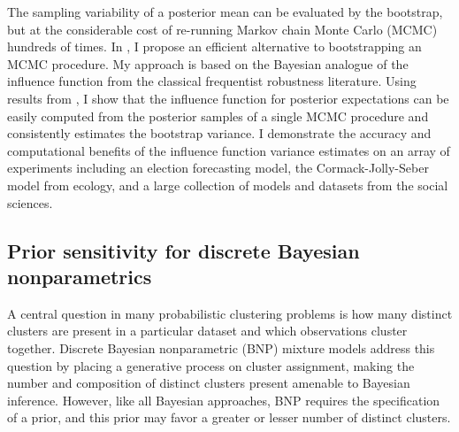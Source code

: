 The sampling variability of a posterior mean can be evaluated by the bootstrap,
but at the considerable cost of re-running Markov chain Monte Carlo (MCMC)
hundreds of times. In \citet{giordano:2020:stanconbayesij,
giordano:2021:bayesij}, I propose an efficient alternative to bootstrapping an
MCMC procedure.  My approach is based on the Bayesian analogue of the influence
function from the classical frequentist robustness literature.  Using results
from \citet{giordano:2018:covariances, giordano:2019:ij}, I show that the
influence function for posterior expectations can be easily computed from the
posterior samples of a single MCMC procedure and consistently estimates the
bootstrap variance. I demonstrate the accuracy and computational benefits of the
influence function variance estimates on an array of experiments including an
election forecasting model, the Cormack-Jolly-Seber model from ecology, and a
large collection of models and datasets from the social sciences.



\subsection{Prior sensitivity for discrete Bayesian nonparametrics}
%
A central question in many probabilistic clustering problems is how many
distinct clusters are present in a particular dataset and which observations
cluster together. Discrete Bayesian nonparametric (BNP) mixture models address
this question by placing a generative process on cluster assignment, making the
number and composition of distinct clusters present amenable to Bayesian
inference.  However, like all Bayesian approaches, BNP requires the
specification of a prior, and this prior may favor a greater or lesser number of
distinct clusters.

